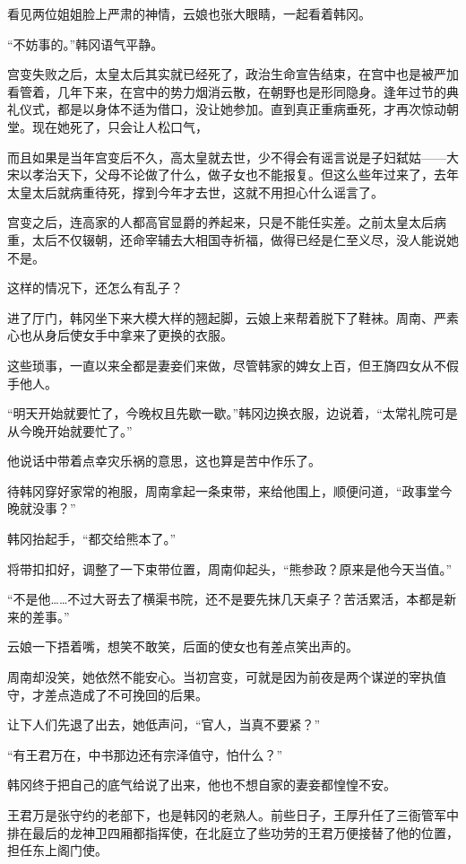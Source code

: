 看见两位姐姐脸上严肃的神情，云娘也张大眼睛，一起看着韩冈。

“不妨事的。”韩冈语气平静。

宫变失败之后，太皇太后其实就已经死了，政治生命宣告结束，在宫中也是被严加看管着，几年下来，在宫中的势力烟消云散，在朝野也是形同隐身。逢年过节的典礼仪式，都是以身体不适为借口，没让她参加。直到真正重病垂死，才再次惊动朝堂。现在她死了，只会让人松口气，

而且如果是当年宫变后不久，高太皇就去世，少不得会有谣言说是子妇弑姑——大宋以孝治天下，父母不论做了什么，做子女也不能报复。但这么些年过来了，去年太皇太后就病重待死，撑到今年才去世，这就不用担心什么谣言了。

宫变之后，连高家的人都高官显爵的养起来，只是不能任实差。之前太皇太后病重，太后不仅辍朝，还命宰辅去大相国寺祈福，做得已经是仁至义尽，没人能说她不是。

这样的情况下，还怎么有乱子？

进了厅门，韩冈坐下来大模大样的翘起脚，云娘上来帮着脱下了鞋袜。周南、严素心也从身后使女手中拿来了更换的衣服。

这些琐事，一直以来全都是妻妾们来做，尽管韩家的婢女上百，但王旖四女从不假手他人。

“明天开始就要忙了，今晚权且先歇一歇。”韩冈边换衣服，边说着，“太常礼院可是从今晚开始就要忙了。”

他说话中带着点幸灾乐祸的意思，这也算是苦中作乐了。

待韩冈穿好家常的袍服，周南拿起一条束带，来给他围上，顺便问道，“政事堂今晚就没事？”

韩冈抬起手，“都交给熊本了。”

将带扣扣好，调整了一下束带位置，周南仰起头，“熊参政？原来是他今天当值。”

“不是他……不过大哥去了横渠书院，还不是要先抹几天桌子？苦活累活，本都是新来的差事。”

云娘一下捂着嘴，想笑不敢笑，后面的使女也有差点笑出声的。

周南却没笑，她依然不能安心。当初宫变，可就是因为前夜是两个谋逆的宰执值守，才差点造成了不可挽回的后果。

让下人们先退了出去，她低声问，“官人，当真不要紧？”

“有王君万在，中书那边还有宗泽值守，怕什么？”

韩冈终于把自己的底气给说了出来，他也不想自家的妻妾都惶惶不安。

王君万是张守约的老部下，也是韩冈的老熟人。前些日子，王厚升任了三衙管军中排在最后的龙神卫四厢都指挥使，在北庭立了些功劳的王君万便接替了他的位置，担任东上阁门使。

